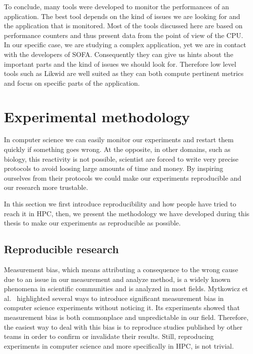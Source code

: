 To conclude, many tools were developed to monitor the performances of an application.
The best tool depends on the kind of issues we are looking for and the application that is monitored.
Most of the tools discussed here are based on performance counters and thus present data from the point of view of the \gls{CPU}.
In our specific case, we are studying a complex application, yet we are in contact with the developers of \gls{SOFA}.
Consequently they can give us hints about the important parts and the kind of issues we should look for.
Therefore low level tools such as \gls{Likwid} are well suited as they can both compute pertinent metrics and focus on specific parts of the application.

\section{Experimental methodology}
\label{sec:expe-methodo}

In computer science we can easily monitor our experiments and restart them quickly if something goes wrong.
At the opposite, in other domains, such as biology,  this reactivity is not possible, scientist are forced to write very precise protocols to avoid loosing large amounts of time and money.
By inspiring ourselves from their protocols we could make our experiments reproducible and our research more trustable.

In this section we first introduce reproducibility and how people have tried to reach it in \gls{HPC}, then, we present the methodology we have developed during this thesis to make our experiments as reproducible as possible.


\subsection{Reproducible research}

Measurement bias, which means attributing a consequence to the wrong cause due to an issue in our measurement and analyze method, is a widely known phenomena in scientific communities and is analyzed in most fields.
Mytkowicz et al.~\cite{Mytkowicz09Producing} highlighted several ways to introduce significant measurement bias in computer science experiments without noticing it.
Its experiments showed that measurement bias is both commonplace and unpredictable in our field.
Therefore, the easiest way to deal with this bias is to reproduce studies published by other teams in order to confirm or invalidate their results.
Still, reproducing experiments in computer science and more specifically in \gls{HPC}, is not trivial.


